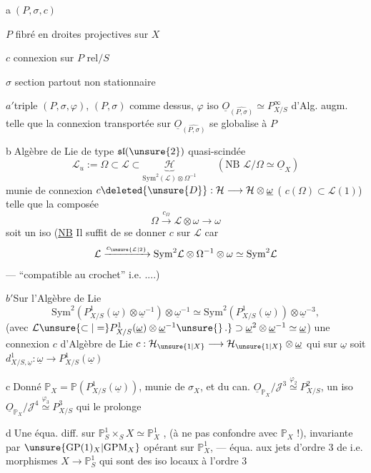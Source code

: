 \textcircled{a}\quad $(P,\sigma,c)$

$P$ fibré en droites projectives sur $X$

$c$ connexion sur $P$ rel$/S$

$\sigma$ section partout non stationnaire

\textcircled{$a'$}\quad triple $(P,\sigma,\varphi)$, $(P,\sigma)$ comme dessus,
$\varphi$ iso  $\underline O_{\widehat{(P,\sigma)}}\simeq P^\infty_{X/S}$ d'Alg. augm. telle que la connexion transportée sur $\underline O_{\widehat{(P,\sigma)}}$  se globalise à $P$

\textcircled{b}\quad Algèbre de Lie de type $\mathfrak{sl}(\unsure{2})$ quasi-scindée
\[
\mathcal L_u:=\Omega\subset\mathcal L\subset\underbrace{\mathcal H}_{\mathrm{Sym}^2(\mathcal L)\otimes\Omega^{-1}}
\qquad(\text{NB }\mathcal L/\Omega\simeq\underline O_X)
\]
munie de connexion $c\deleted{\unsure{D}}:\mathcal H\longrightarrow\mathcal H\otimes\underline\omega$
( $c(\Omega)\subset\mathcal L(1)$) telle que la composée
\[
\Omega\xrightarrow{c_\Omega}\mathcal L\otimes\omega\longrightarrow\omega
\]
soit un iso (\uline{NB} Il suffit de se donner $c$ sur $\mathcal L$  car
\[
\mathcal L\xrightarrow{c_{\unsure{\mathcal L|2}}}\mathrm{Sym}^2\mathcal L\otimes\Omega^{-1}\otimes\omega\simeq\mathrm{Sym}^2\mathcal L
\]
--- ``compatible au crochet'' i.e. ....)

\textcircled{$b'$}\quad Sur l'Algèbre de Lie 
\[
\mathrm{Sym}^2(P^1_{X/S}(\underline\omega)\otimes\underline\omega^{-1})\otimes\underline\omega^{-1}
\simeq\mathrm{Sym}^2(P^1_{X/S}(\underline\omega))\otimes\underline\omega^{-3},
\]
(avec $\mathcal L\unsure{\subset|=}P^1_{X/S}(\underline\omega)\otimes\underline\omega^{-1}\unsure{\}\,.}\supset\underline\omega^2\otimes\underline\omega^{-1}\simeq\underline\omega$)
une connexion $c$ d'Algèbre de Lie
 $c:\mathcal H_{\unsure{1|X}}\longrightarrow\mathcal H_{\unsure{1|X}}\otimes\underline\omega$
qui sur $\underline\omega$ soit $d^1_{X/S,\underline\omega}:\underline\omega\longrightarrow P^1_{X/S}(\underline\omega)$

\textcircled{c}\quad Donné $\mathbb P_X=\mathbb P(P^1_{X/S}(\underline\omega))$, munie de $\sigma_X$, et du  can.
$\underline O_{\mathbb P_X}/\mathcal J^3\overset{\varphi_2}{\simeq}P^2_{X/S}$, un iso
$\underline O_{\mathbb P_X}/\mathcal J^4\overset{\varphi_3}{\simeq}P^3_{X/S}$ qui le prolonge

\textcircled{d}\quad Une équa. diff.  sur $\mathbb P^1_S\times_S X\simeq\mathbb P^1_X$ , (à ne pas confondre avec $\mathbb P_X$ !), invariante par $\unsure{\mathrm{GP}(1)_X|\mathrm{GPM}_X}$ opérant sur $\mathbb P^1_X$, --- équa.  aux jets d'ordre 3 de  i.e. morphismes $X\longrightarrow\mathbb P^1_S$ qui sont des iso locaux à l'ordre 3
